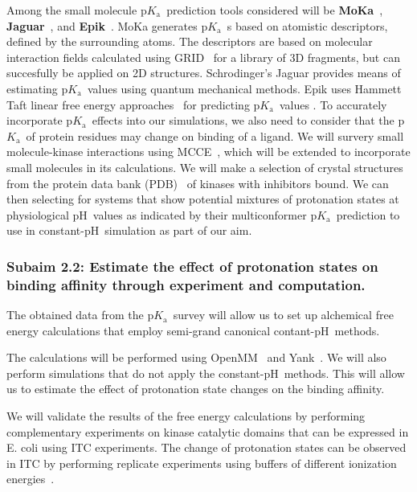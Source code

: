 \documentclass[10pt,final]{article}
\newcommand{\pKa}{p$K_\mathrm{a}$\ }
\newcommand{\pH}{p$\mathrm{H}$\ }
\begin{document}
Among the small molecule \pKa prediction tools considered will be \textbf{MoKa}~\autocite{Milletti2007a}, \textbf{Jaguar}~\autocite{Bochevarov2013a}, and \textbf{Epik}~\autocite{Shelley2007a,Greenwood2010a}.
%
MoKa generates \pKa{}s based on atomistic descriptors, defined by the surrounding atoms.
%
The descriptors are based on molecular interaction fields calculated using GRID~\autocite{Goodford1985a} for a library of 3D fragments, but can succesfully be applied on 2D structures.
%
Schrodinger's Jaguar provides means of estimating \pKa values using quantum mechanical methods.
%
Epik uses Hammett Taft linear free energy approaches~\autocite{Perrin1981a} for predicting \pKa values .
%
To accurately incorporate \pKa effects into our simulations, we also need to consider that the \pKa of protein residues may change on binding of a ligand.
%
We will survery small molecule-kinase interactions using MCCE~\autocite{Song2009a}, which will be extended to incorporate small molecules in its calculations.
%
We will make a selection of crystal structures from the protein data bank (PDB)~\autocite{Berman2000a} of kinases with inhibitors bound.
%
We can then selecting for systems that show potential mixtures of protonation states at physiological \pH values as indicated by their multiconformer \pKa prediction to use in constant-\pH simulation as part of our aim. 


\subsubsection*{Subaim 2.2: Estimate the effect of protonation states on binding affinity through experiment and computation.}
The obtained data from the \pKa survey will allow us to set up alchemical free energy calculations that employ semi-grand canonical contant-\pH methods.~\autocite{Mongan2004a,Stern2007a,Nilmeier2011a}

The calculations will be performed using OpenMM~\autocite{Eastman2013a} and Yank~\autocite{Chodera2015a}.
%
We will also perform simulations that do not apply the constant-\pH methods. This will allow us to estimate the effect of protonation state changes on the binding affinity.

We will validate the results of the free energy calculations by performing complementary experiments on kinase catalytic domains that can be expressed in E. coli using ITC experiments.
%
The change of protonation states can be observed in ITC by performing replicate experiments using buffers of different ionization energies~\autocite{Baker1996a,Neeb2014a}.
\end{document}
